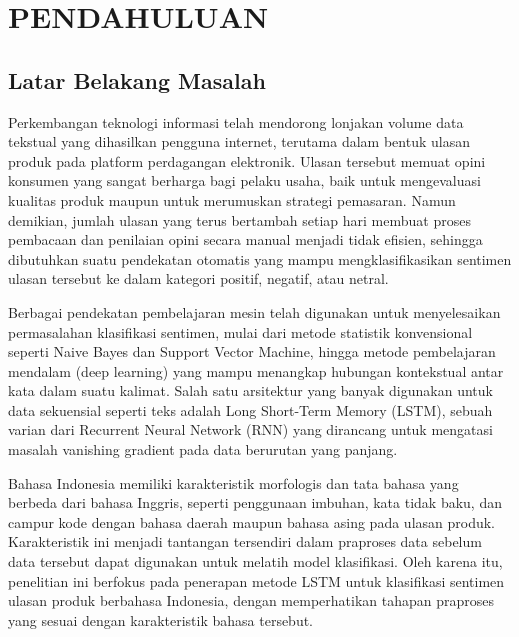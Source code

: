 
\chapter{PENDAHULUAN}

\section{Latar Belakang Masalah}
Perkembangan teknologi informasi telah mendorong lonjakan volume data
tekstual yang dihasilkan pengguna internet, terutama dalam bentuk
ulasan produk pada platform perdagangan elektronik. Ulasan tersebut
memuat opini konsumen yang sangat berharga bagi pelaku usaha, baik
untuk mengevaluasi kualitas produk maupun untuk merumuskan strategi
pemasaran. Namun demikian, jumlah ulasan yang terus bertambah setiap
hari membuat proses pembacaan dan penilaian opini secara manual
menjadi tidak efisien, sehingga dibutuhkan suatu pendekatan otomatis
yang mampu mengklasifikasikan sentimen ulasan tersebut ke dalam
kategori positif, negatif, atau netral.

Berbagai pendekatan pembelajaran mesin telah digunakan untuk
menyelesaikan permasalahan klasifikasi sentimen, mulai dari metode
statistik konvensional seperti Naive Bayes dan Support Vector Machine,
hingga metode pembelajaran mendalam (deep learning) yang mampu
menangkap hubungan kontekstual antar kata dalam suatu kalimat. Salah
satu arsitektur yang banyak digunakan untuk data sekuensial seperti
teks adalah Long Short-Term Memory (LSTM), sebuah varian dari
Recurrent Neural Network (RNN) yang dirancang untuk mengatasi masalah
vanishing gradient pada data berurutan yang panjang.

Bahasa Indonesia memiliki karakteristik morfologis dan tata bahasa
yang berbeda dari bahasa Inggris, seperti penggunaan imbuhan, kata
tidak baku, dan campur kode dengan bahasa daerah maupun bahasa asing
pada ulasan produk. Karakteristik ini menjadi tantangan tersendiri
dalam praproses data sebelum data tersebut dapat digunakan untuk
melatih model klasifikasi. Oleh karena itu, penelitian ini berfokus
pada penerapan metode LSTM untuk klasifikasi sentimen ulasan produk
berbahasa Indonesia, dengan memperhatikan tahapan praproses yang
sesuai dengan karakteristik bahasa tersebut.

